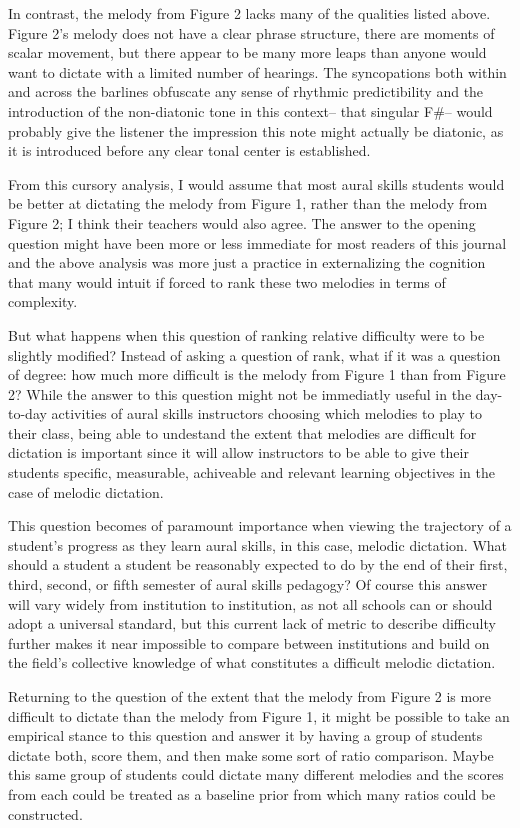 \documentclass[english,man,floatsintext]{apa6}
\begin{document}
In contrast, the melody from Figure 2 lacks many of the qualities listed above.
Figure 2's melody does not have a clear phrase structure, there are moments of scalar movement, but there appear to be many more leaps than anyone would want to dictate with a limited number of hearings. The syncopations both within and across the barlines obfuscate any sense of rhythmic predictibility and the introduction of the non-diatonic tone in this context-- that singular F\#-- would probably give the listener the impression this note might actually be diatonic, as it is introduced before any clear tonal center is established.

From this cursory analysis, I would assume that most aural skills students would be better at dictating the melody from Figure 1, rather than the melody from Figure 2; I think their teachers would also agree.
The answer to the opening question might have been more or less immediate for most readers of this journal and the above analysis was more just a practice in externalizing the cognition that many would intuit if forced to rank these two melodies in terms of complexity.

But what happens when this question of ranking relative difficulty were to be slightly modified?
Instead of asking a question of rank, what if it was a question of degree: how much more difficult is the melody from Figure 1 than from Figure 2?
While the answer to this question might not be immediatly useful in the day-to-day activities of aural skills instructors choosing which melodies to play to their class, being able to undestand the extent that melodies are difficult for dictation is important since it will allow instructors to be able to give their students specific, measurable, achiveable and relevant learning objectives in the case of melodic dictation.

This question becomes of paramount importance when viewing the trajectory of a student's progress as they learn aural skills, in this case, melodic dictation.
What should a student a student be reasonably expected to do by the end of their first, third, second, or fifth semester of aural skills pedagogy?
Of course this answer will vary widely from institution to institution, as not all schools can or should adopt a universal standard, but this current lack of metric to describe difficulty further makes it near impossible to compare between institutions and build on the field's collective knowledge of what constitutes a difficult melodic dictation.

Returning to the question of the extent that the melody from Figure 2 is more difficult to dictate than the melody from Figure 1, it might be possible to take an empirical stance to this question and answer it by having a group of students dictate both, score them, and then make some sort of ratio comparison.
Maybe this same group of students could dictate many different melodies and the scores from each could be treated as a baseline prior from which many ratios could be constructed.
\end{document}
